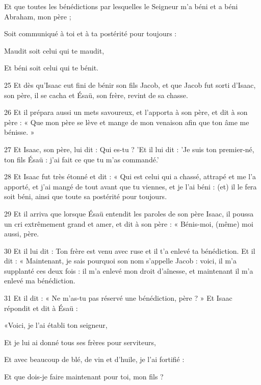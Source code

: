 \par    
\par     Et que toutes les bénédictions par lesquelles le Seigneur m'a béni et a béni Abraham, mon père ;  
\par     Soit communiqué à toi et à ta postérité pour toujours :
\par    
\par     Maudit soit celui qui te maudit,  
\par     Et béni soit celui qui te bénit.
\par    
\par 25 Et dès qu'Isaac eut fini de bénir son fils Jacob, et que Jacob fut sorti d'Isaac, son père, il se cacha et Ésaü, son frère, revint de sa chasse.
\par 26 Et il prépara aussi un mets savoureux, et l'apporta à son père, et dit à son père : « Que mon père se lève et mange de mon venaison afin que ton âme me bénisse. »
\par 27 Et Isaac, son père, lui dit : Qui es-tu ? 'Et il lui dit : 'Je suis ton premier-né, ton fils Ésaü : j'ai fait ce que tu m'as commandé.'
\par 28 Et Isaac fut très étonné et dit : « Qui est celui qui a chassé, attrapé et me l'a apporté, et j'ai mangé de tout avant que tu viennes, et je l'ai béni : (et) il le fera soit béni, ainsi que toute sa postérité pour toujours.
\par 29 Et il arriva que lorsque Ésaü entendit les paroles de son père Isaac, il poussa un cri extrêmement grand et amer, et dit à son père : « Bénis-moi, (même) moi aussi, père.
\par 30 Et il lui dit : Ton frère est venu avec ruse et il t'a enlevé ta bénédiction. Et il dit : « Maintenant, je sais pourquoi son nom s'appelle Jacob : voici, il m'a supplanté ces deux fois : il m'a enlevé mon droit d'aînesse, et maintenant il m'a enlevé ma bénédiction.
\par 31 Et il dit : « Ne m'as-tu pas réservé une bénédiction, père ? » Et Isaac répondit et dit à Ésaü :
\par    
\par     «Voici, je l'ai établi ton seigneur,  
\par     Et je lui ai donné tous ses frères pour serviteurs,  
\par     Et avec beaucoup de blé, de vin et d'huile, je l'ai fortifié :
\par    
\par     Et que dois-je faire maintenant pour toi, mon fils ?
